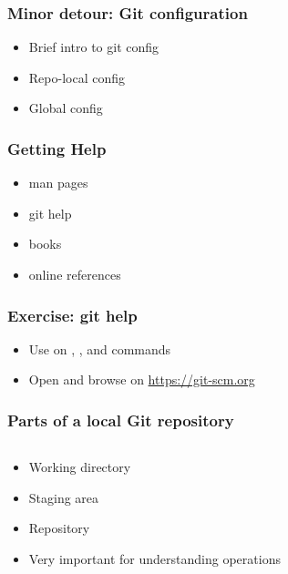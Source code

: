 \documentclass{git_course}
\begin{document}
\begin{frame}
\frametitle{Minor detour: Git configuration}
\begin{itemize}
    \item Brief intro to git config
    \item Repo-local config
    \item Global config
\end{itemize}
\end{frame}

\begin{frame}
\frametitle{Getting Help}
\begin{itemize}
    \item man pages
    \item git help
    \item books
    \item online references
\end{itemize}
\end{frame}

\begin{frame}
\frametitle{Exercise: git help}
\begin{itemize}
    \item Use  on , ,  and
         commands
    \item Open and browse on \url{https://git-scm.org}
\end{itemize}
\end{frame}

\begin{frame}[fragile]
\frametitle{Parts of a local Git repository}
\begin{columns}[T]
    \begin{column}{0.5\textwidth}
        \begin{itemize}
            \item Working directory
            \item Staging area
            \item Repository
            \item Very important for understanding operations
        \end{itemize}
    \end{column}

    \begin{column}{0.5\textwidth}
        \begin{center}
            \resizebox{!}{0.7\textheight}{
                
            }
        \end{center}
    \end{column}
\end{columns}
\end{frame}
\end{document}
